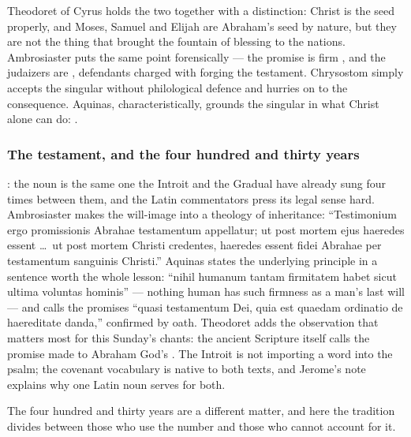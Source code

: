 Theodoret of Cyrus holds the two together with a distinction: Christ is the
seed properly, and Moses, Samuel and Elijah are Abraham's seed by nature, but
they are not the thing that brought the fountain of blessing to the nations.
Ambrosiaster puts the same point forensically --- the promise is firm
, and the judaizers are
, defendants charged with forging the
testament. Chrysostom simply accepts the singular without philological
defence and hurries on to the consequence. Aquinas, characteristically,
grounds the singular in what Christ alone can do: .

\subsubsection*{The testament, and the four hundred and thirty years}

: the noun is the same one the Introit
and the Gradual have already sung four times between them, and the Latin
commentators press its legal sense hard. Ambrosiaster makes the will-image
into a theology of inheritance: ``Testimonium ergo promissionis Abrahae
testamentum appellatur; ut post mortem ejus haeredes essent \dots\ ut post
mortem Christi credentes, haeredes essent fidei Abrahae per testamentum
sanguinis Christi.'' Aquinas states the underlying principle in a sentence
worth the whole lesson: ``nihil humanum tantam firmitatem habet sicut ultima
voluntas hominis'' --- nothing human has such firmness as a man's last will ---
and calls the promises ``quasi testamentum Dei, quia est quaedam ordinatio de
haereditate danda,'' confirmed by oath. Theodoret adds the observation that
matters most for this Sunday's chants: the ancient Scripture itself calls the
promise made to Abraham God's . The Introit is not importing a
word into the psalm; the covenant vocabulary is native to both texts, and
Jerome's  note explains why one Latin noun serves for both.

The four hundred and thirty years are a different matter, and here the
tradition divides between those who use the number and those who cannot
account for it.


